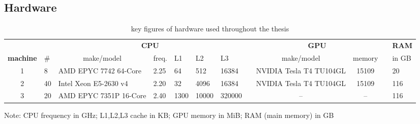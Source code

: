 \clearpage
\begin{landscape}
\subsection{Hardware}
 \begin{table}[hbp]
\small
\centering
\begin{tabular}{c|lllllllccll}
\hline
\textbf{}        &    & \multicolumn{5}{c}{\textbf{CPU}}                               &  & \multicolumn{2}{c}{\textbf{GPU}} &  & \multicolumn{1}{c}{\textbf{RAM}} \\
\textbf{machine} & \# & \multicolumn{1}{c}{make/model} & freq. & L1   & L2    & L3     &  & make/model              & memory &  & in GB                            \\ \hline
1                & 8  & AMD EPYC 7742 64-Core          & 2.25  & 64   & 512   & 16384  &  & NVIDIA Tesla T4 TU104GL & 15109  &  & 20                               \\
2                & 40 & Intel Xeon E5-2630 v4          & 2.20  & 32   & 4096  & 16384  &  & NVIDIA Tesla T4 TU104GL & 15109  &  & 116                              \\
3                & 20 & AMD EPYC 7351P 16-Core         & 2.40  & 1300 & 10000 & 320000 &  & --                      & --     &  & 116                              \\ \hline
\end{tabular}
\caption{key figures of hardware used throughout the thesis}\label{tab:appendix:hardware}
\end{table}
Note: CPU frequency in GHz; L1,L2,L3 cache in KB; GPU memory in MiB; RAM (main memory) in GB
\end{landscape}


